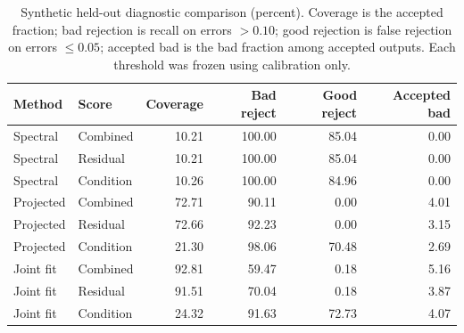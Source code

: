 \begin{table}[t]
\centering
\small
\caption{Synthetic held-out diagnostic comparison (percent). Coverage is the accepted fraction; bad rejection is recall on errors $>0.10$; good rejection is false rejection on errors $\le0.05$; accepted bad is the bad fraction among accepted outputs. Each threshold was frozen using calibration only.}
\label{tab:trusted-diagnostics}
\begin{tabular}{llrrrr}
\toprule
Method & Score & Coverage & Bad reject & Good reject & Accepted bad \\
\midrule
Spectral & Combined & 10.21 & 100.00 & 85.04 & 0.00 \\
Spectral & Residual & 10.21 & 100.00 & 85.04 & 0.00 \\
Spectral & Condition & 10.26 & 100.00 & 84.96 & 0.00 \\
Projected & Combined & 72.71 & 90.11 & 0.00 & 4.01 \\
Projected & Residual & 72.66 & 92.23 & 0.00 & 3.15 \\
Projected & Condition & 21.30 & 98.06 & 70.48 & 2.69 \\
Joint fit & Combined & 92.81 & 59.47 & 0.18 & 5.16 \\
Joint fit & Residual & 91.51 & 70.04 & 0.18 & 3.87 \\
Joint fit & Condition & 24.32 & 91.63 & 72.73 & 4.07 \\
\bottomrule
\end{tabular}
\end{table}
